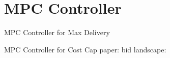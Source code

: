\documentclass[../main.tex]{subfiles}
\begin{document}
	\chapter{MPC Controller}
	
	
	\begin{section}{MPC Controller for Max Delivery}
		
	\end{section}
	
	\begin{section} {MPC Controller for Cost Cap}
		paper: \cite{yang2019bid} 
		bid landscape: \cite{cui2011bid} \cite{ren2019deep} \cite{wu2015predicting} \cite{lang2012handling} \cite{wang2016functional}
	\end{section}
	
\end{document}
